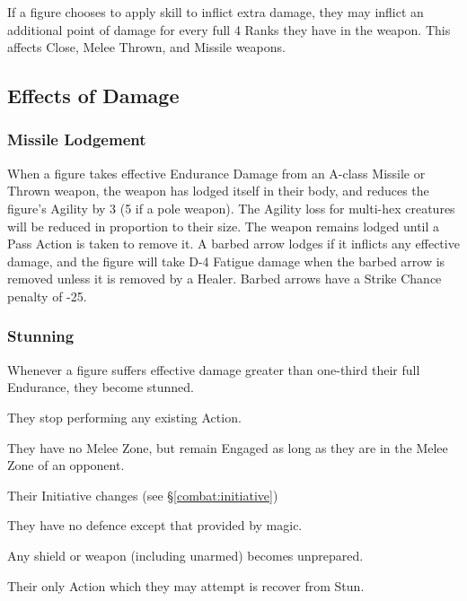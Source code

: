 \begin{multicols*}{3}
If a figure chooses to apply skill to inflict extra damage, they may
inflict an additional point of damage for every full 4 Ranks they have
in the weapon. This affects Close, Melee Thrown, and Missile weapons.

\subsection{Effects of Damage}

\subsubsection{Missile Lodgement}

When a figure takes effective Endurance Damage from an A-class Missile
or Thrown weapon, the weapon has lodged itself in their body, and
reduces the figure's Agility by 3 (5 if a pole weapon). The Agility
loss for multi-hex creatures will be reduced in proportion to their
size. The weapon remains lodged until a Pass Action is taken to remove
it. A barbed arrow lodges if it inflicts any effective damage, and the
figure will take D-4 Fatigue damage when the barbed arrow is removed
unless it is removed by a Healer. Barbed arrows have a Strike Chance
penalty of -25.

\subsubsection{Stunning}

Whenever a figure suffers effective damage greater than one-third
their full Endurance, they become stunned.
\begin{Itemize}

\item They stop performing any existing Action.

\item They have no Melee Zone, but remain Engaged as long as they are
in the Melee Zone of an opponent.

\item Their Initiative changes (see \S\ref{combat:initiative})

\item They have no defence except that provided by magic.

\item Any shield or weapon (including unarmed) becomes unprepared. 

\item Their only Action which they may attempt is recover from Stun.


\end{Itemize}
\end{multicols*}
